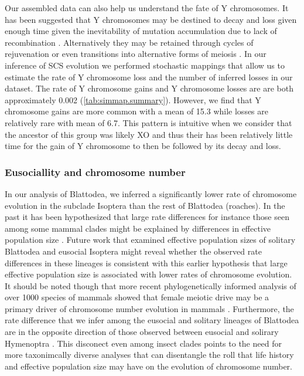 Our assembled data can also help us understand the fate of Y chromosomes. 
It has been suggested that Y chromosomes may be destined to decay and loss given enough time given the inevitability of mutation accumulation due to lack of recombination \citep{steinemann2005}.
Alternatively they may be retained through cycles of rejuvenation or even transitions into alternative forms of meiosis \citep{blackmon2015bioessay}.
In our inference of SCS evolution we performed stochastic mappings that allow us to estimate the rate of Y chromosome loss and the number of inferred losses in our dataset.
The rate of Y chromosome gains and Y chromosome losses are are both approximately 0.002 (\cref{tab:simmap.summary}). 
However, we find that Y chromosome gains are more common with a mean of 15.3 while losses are relatively rare with mean of 6.7.
This pattern is intuitive when we consider that the ancestor of this group was likely XO and thus their has been relatively little time for the gain of Y chromosome to then be followed by its decay and loss.

\subsubsection{Eusociallity and chromosome number}

In our analysis of Blattodea, we inferred a significantly lower rate of chromosome evolution in the subclade Isoptera than the rest of Blattodea (roaches).
In the past it has been hypothesized that large rate differences for instance those seen among some mammal clades might be explained by differences in effective population size \citep{bush1977rapid}.
Future work that examined effective population sizes of solitary Blattodea and eusocial Isoptera might reveal whether the observed rate differences in these lineages is consistent with this earlier hypothesis that large effective population size is associated with lower rates of chromosome evolution.
It should be noted though that more recent phylogenetically informed analysis of over 1000 species of mammals showed that female meiotic drive may be a primary driver of chromosome number evolution in mammals \citep{blackmon2019meiotic}.
Furthermore, the rate difference that we infer among the eusocial and solitary lineages of Blattodea are in the opposite direction of those observed between eusocial and solirary Hymenoptra \citep{ross2015}.
This disconect even among insect clades points to the need for more taxonimcally diverse analyses that can disentangle the roll that life history and effective population size may have on the evolution of chromosome number.

